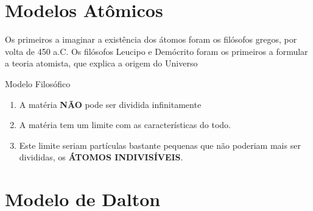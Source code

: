 \documentclass[10pt]{scrartcl}
\date{\today}
\title{}
\def\disciplina{Química}
\begin{document}
\twocolumn[

%
%
%



%

\smallbreak
\medbreak
\par\vspace{2ex}]%

\section{Modelos Atômicos}
\label{sec:org5c280df}
Os primeiros a imaginar a existência dos átomos foram os filósofos gregos, por volta de 450 a.C.
Os filósofos Leucipo e Demócrito foram os primeiros a formular a teoria atomista, que explica a origem do Universo

\begin{Box2}{Modelo Filosófico}
\begin{enumerate}
\item A matéria \textbf{NÃO} pode ser dividida infinitamente
\item A matéria tem um limite com as características do todo.
\item Este limite seriam partículas bastante pequenas que não poderiam mais ser divididas, os \textbf{ÁTOMOS INDIVISÍVEIS}.
\end{enumerate}
\end{Box2}


\section{Modelo de Dalton}
\label{sec:orgb900704}
\end{document}
